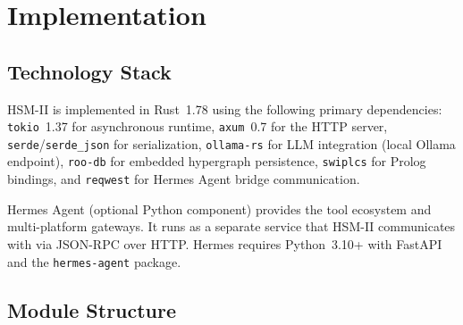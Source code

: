 \documentclass[11pt]{article}
\begin{document}
\section{Implementation}
\nopagebreak[4]
\label{sec:impl}

\subsection{Technology Stack}

HSM-II is implemented in Rust~1.78 using the following primary dependencies:
\texttt{tokio}~1.37 for asynchronous runtime, \texttt{axum}~0.7 for the HTTP
server, \texttt{serde}/\texttt{serde\_json} for serialization,
\texttt{ollama-rs} for LLM integration (local Ollama endpoint),
\texttt{roo-db} for embedded hypergraph persistence,
\texttt{swiplcs} for Prolog bindings, and
\texttt{reqwest} for Hermes Agent bridge communication.

Hermes Agent (optional Python component) provides the tool ecosystem and
multi-platform gateways. It runs as a separate service that HSM-II communicates
with via JSON-RPC over HTTP. Hermes requires Python~3.10+ with FastAPI and
the \texttt{hermes-agent} package.

\subsection{Module Structure}
\end{document}
